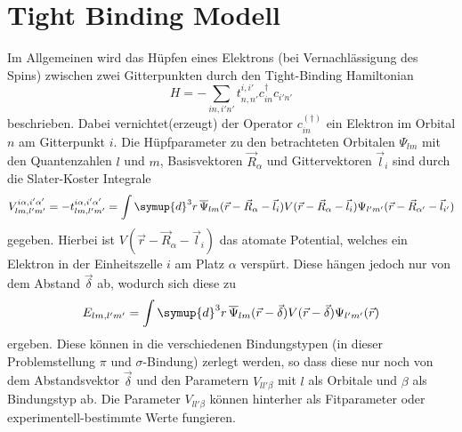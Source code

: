 \section{Tight Binding Modell}
\label{sec:tightbinding}
Im Allgemeinen wird das Hüpfen eines Elektrons (bei Vernachlässigung des Spins) zwischen zwei Gitterpunkten durch den Tight-Binding Hamiltonian 
\begin{equation}
    H = - \sum_{in,i'n'} t_{n,n'}^{i,i'}  c_{in}^\dagger c_{i'n'}  \label{eqn:tight-binding-hamiltonian}
\end{equation}
beschrieben.\cite{SC_literature}
Dabei vernichtet(erzeugt) der Operator $c_{in}^{(\dagger)}$ ein Elektron im Orbital $n$ am Gitterpunkt $i$.
Die Hüpfparameter zu den betrachteten Orbitalen $\Psi_{lm}$ mit den Quantenzahlen $l$ und $m$, Basisvektoren $\vec{R}_\alpha$ und Gittervektoren
$\vec{l}_i$ sind durch die Slater-Koster Integrale \cite{PhysRev.94.1498}
\begin{equation} 
    V_{lm,l'm'}^{i\alpha,i'\alpha'} = -t_{lm,l'm'}^{i\alpha,i'\alpha'} = \int \symup{d}^3r \, \overline{\Psi}_{lm} (\vec{r} - \vec{R}_\alpha - \vec{l}_i)
    V(\vec{r} - \vec{R}_\alpha - \vec{l}_i) \Psi_{l'm'} (\vec{r} - \vec{R}_ {\alpha'} - \vec{l}_{i'})
\end{equation}
gegeben.\cite{SC_literature}
Hierbei ist $V(\vec{r} - \vec{R}_\alpha - \vec{l}_i)$ das atomate Potential, welches ein Elektron in der Einheitszelle $i$ am Platz $\alpha$ verspürt.
Diese hängen jedoch nur von dem Abstand $\vec{\delta}$ ab, wodurch sich diese zu 
\begin{equation}
    E_{lm,l'm'} = \int \symup{d}^3r \, \overline{\Psi}_{lm} (\vec{r}-\vec{\delta})
    V(\vec{r} - \vec{\delta}) \Psi_{l'm'} (\vec{r})
\end{equation}
ergeben.
Diese können in die verschiedenen Bindungstypen (in dieser Problemstellung $\pi$ und $\sigma$-Bindung) zerlegt werden, so dass diese nur noch von dem Abstandsvektor 
$\vec{\delta}$ und den Parametern $V_{ll'\beta}$ mit $l$ als Orbitale und $\beta$ als Bindungstyp ab.\cite{SC_literature}
Die Parameter $V_{ll'\beta}$ können hinterher als Fitparameter oder experimentell-bestimmte Werte fungieren.